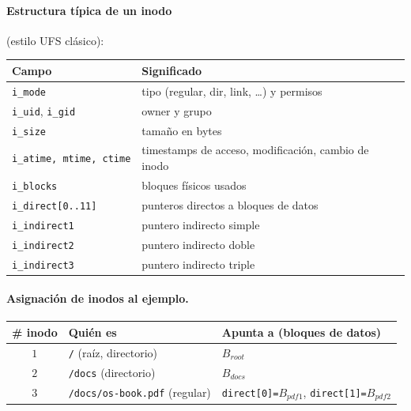 \documentclass[11pt,a4paper]{article}
\begin{document}
\paragraph{Estructura típica de un inodo} (estilo UFS clásico):

\begin{center}
\small
\begin{tabular}{@{}lp{8cm}@{}}
\toprule
Campo & Significado \\
\midrule
\texttt{i\_mode}                 & tipo (regular, dir, link, \ldots) y permisos \\
\texttt{i\_uid}, \texttt{i\_gid} & owner y grupo \\
\texttt{i\_size}                 & tamaño en bytes \\
\texttt{i\_atime, mtime, ctime}  & timestamps de acceso, modificación, cambio de inodo \\
\texttt{i\_blocks}               & bloques físicos usados \\
\texttt{i\_direct[0..11]}        & punteros directos a bloques de datos \\
\texttt{i\_indirect1}            & puntero indirecto simple \\
\texttt{i\_indirect2}            & puntero indirecto doble \\
\texttt{i\_indirect3}            & puntero indirecto triple \\
\bottomrule
\end{tabular}
\end{center}

\paragraph{Asignación de inodos al ejemplo.}

\begin{center}
\small
\begin{tabular}{@{}clp{6.5cm}@{}}
\toprule
\# inodo & Quién es & Apunta a (bloques de datos) \\
\midrule
$1$ & \texttt{/} (raíz, directorio)        & $B_{root}$ \\
$2$ & \texttt{/docs} (directorio)           & $B_{docs}$ \\
$3$ & \texttt{/docs/os-book.pdf} (regular) & \texttt{direct[0]=$B_{pdf1}$}, \texttt{direct[1]=$B_{pdf2}$} \\
\bottomrule
\end{tabular}
\end{center}
\end{document}
